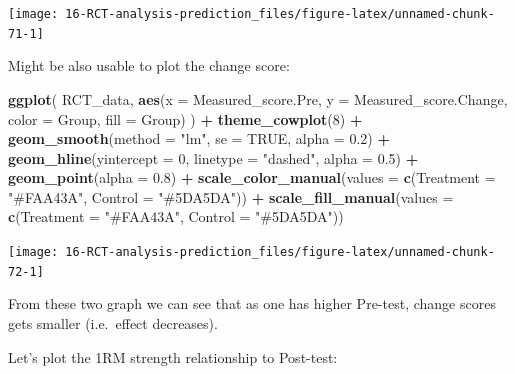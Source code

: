 \documentclass[
]{book}
\newenvironment{Shaded}{\begin{snugshade}}{\end{snugshade}}
\newcommand{\DataTypeTok}[1]{\textcolor[rgb]{0.13,0.29,0.53}{#1}}
\newcommand{\DecValTok}[1]{\textcolor[rgb]{0.00,0.00,0.81}{#1}}
\newcommand{\FloatTok}[1]{\textcolor[rgb]{0.00,0.00,0.81}{#1}}
\newcommand{\KeywordTok}[1]{\textcolor[rgb]{0.13,0.29,0.53}{\textbf{#1}}}
\newcommand{\NormalTok}[1]{#1}
\newcommand{\OperatorTok}[1]{\textcolor[rgb]{0.81,0.36,0.00}{\textbf{#1}}}
\newcommand{\OtherTok}[1]{\textcolor[rgb]{0.56,0.35,0.01}{#1}}
\newcommand{\StringTok}[1]{\textcolor[rgb]{0.31,0.60,0.02}{#1}}
\begin{document}
\begin{center}\texttt{[image: 16-RCT-analysis-prediction\_files/figure-latex/unnamed-chunk-71-1]} \end{center}

Might be also usable to plot the change score:

\begin{Shaded}
\begin{Highlighting}[]
\KeywordTok{ggplot}\NormalTok{(}
\NormalTok{  RCT\_data,}
  \KeywordTok{aes}\NormalTok{(}\DataTypeTok{x =}\NormalTok{ Measured\_score.Pre, }\DataTypeTok{y =}\NormalTok{ Measured\_score.Change, }\DataTypeTok{color =}\NormalTok{ Group, }\DataTypeTok{fill =}\NormalTok{ Group)}
\NormalTok{) }\OperatorTok{+}
\StringTok{  }\KeywordTok{theme\_cowplot}\NormalTok{(}\DecValTok{8}\NormalTok{) }\OperatorTok{+}
\StringTok{  }\KeywordTok{geom\_smooth}\NormalTok{(}\DataTypeTok{method =} \StringTok{"lm"}\NormalTok{, }\DataTypeTok{se =} \OtherTok{TRUE}\NormalTok{, }\DataTypeTok{alpha =} \FloatTok{0.2}\NormalTok{) }\OperatorTok{+}
\StringTok{  }\KeywordTok{geom\_hline}\NormalTok{(}\DataTypeTok{yintercept =} \DecValTok{0}\NormalTok{, }\DataTypeTok{linetype =} \StringTok{"dashed"}\NormalTok{, }\DataTypeTok{alpha =} \FloatTok{0.5}\NormalTok{) }\OperatorTok{+}
\StringTok{  }\KeywordTok{geom\_point}\NormalTok{(}\DataTypeTok{alpha =} \FloatTok{0.8}\NormalTok{) }\OperatorTok{+}
\StringTok{  }\KeywordTok{scale\_color\_manual}\NormalTok{(}\DataTypeTok{values =} \KeywordTok{c}\NormalTok{(}\DataTypeTok{Treatment =} \StringTok{"\#FAA43A"}\NormalTok{, }\DataTypeTok{Control =} \StringTok{"\#5DA5DA"}\NormalTok{)) }\OperatorTok{+}
\StringTok{  }\KeywordTok{scale\_fill\_manual}\NormalTok{(}\DataTypeTok{values =} \KeywordTok{c}\NormalTok{(}\DataTypeTok{Treatment =} \StringTok{"\#FAA43A"}\NormalTok{, }\DataTypeTok{Control =} \StringTok{"\#5DA5DA"}\NormalTok{))}
\end{Highlighting}
\end{Shaded}

\begin{center}\texttt{[image: 16-RCT-analysis-prediction\_files/figure-latex/unnamed-chunk-72-1]} \end{center}

From these two graph we can see that as one has higher Pre-test, change scores gets smaller (i.e.~effect decreases).

Let's plot the 1RM strength relationship to Post-test:
\end{document}
